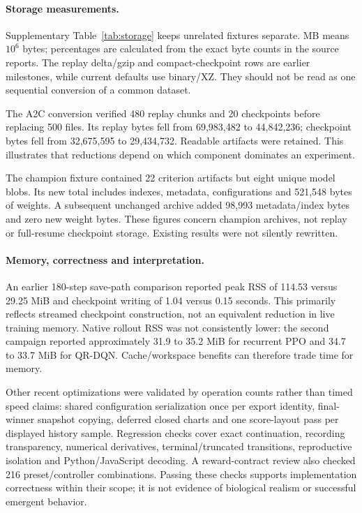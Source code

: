 \paragraph{Storage measurements.}
Supplementary Table~\ref{tab:storage} keeps unrelated fixtures separate. MB means $10^6$ bytes;
percentages are calculated from the exact byte counts in the source reports.
The replay delta/gzip and compact-checkpoint rows are earlier milestones, while
current defaults use binary/XZ. They should not be read as one sequential
conversion of a common dataset.



The A2C conversion verified 480 replay chunks and 20 checkpoints before replacing
500 files. Its replay bytes fell from 69,983,482 to 44,842,236; checkpoint bytes
fell from 32,675,595 to 29,434,732. Readable artifacts were retained. This
illustrates that reductions depend on which component dominates an experiment.

The champion fixture contained 22 criterion artifacts but eight unique model
blobs. Its new total includes indexes, metadata, configurations and 521,548 bytes
of weights. A subsequent unchanged archive added 98,993 metadata/index bytes
and zero new weight bytes. These figures concern champion archives, not replay
or full-resume checkpoint storage. Existing results were not silently rewritten.

\paragraph{Memory, correctness and interpretation.}
An earlier 180-step save-path comparison reported peak RSS of 114.53 versus
29.25 MiB and checkpoint writing of 1.04 versus 0.15 seconds. This primarily
reflects streamed checkpoint construction, not an equivalent reduction in live
training memory. Native rollout RSS was not consistently lower: the second
campaign reported approximately 31.9 to 35.2 MiB for recurrent PPO and 34.7 to
33.7 MiB for QR-DQN. Cache/workspace benefits can therefore trade time for memory.

Other recent optimizations were validated by operation counts rather than timed
speed claims: shared configuration serialization once per export identity,
final-winner snapshot copying, deferred closed charts and one score-layout pass
per displayed history sample. Regression checks cover exact continuation,
recording transparency, numerical derivatives, terminal/truncated transitions,
reproductive isolation and Python/JavaScript decoding. A reward-contract review
also checked 216 preset/controller combinations. Passing these checks supports
implementation correctness within their scope; it is not evidence of biological
realism or successful emergent behavior.
